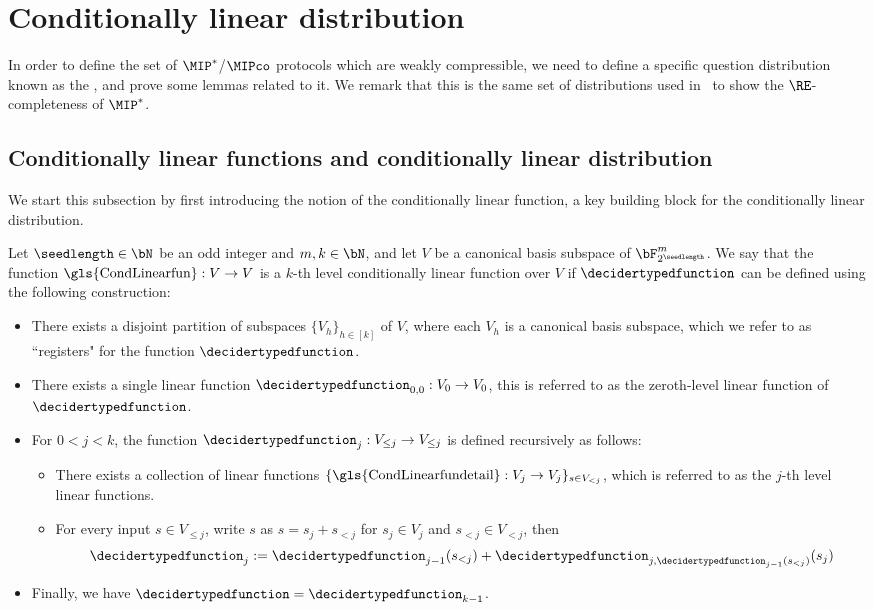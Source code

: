 \section{Conditionally linear distribution} \label{sec:condlineardistribution}

In order to define the set of $\MIP^*$/$\MIPco$ protocols which are weakly compressible, we need to define a specific question distribution known as the , and prove some lemmas related to it. We remark that this is the same set of distributions used in~\cite{jiMIPRE2022a} to show the $\RE$-completeness of $\MIP^*$. 

\subsection{Conditionally linear functions and conditionally linear distribution}  \label{sec:condlinearfun}
We start this subsection by first introducing the notion of the conditionally linear function, a key building block for the conditionally linear distribution.
\begin{definition} \label{def:condlinfun}
	Let $\seedlength \in \bN$ be an odd integer and $m, k \in \bN$, and let $V$ be a canonical basis subspace of $\bF_{2^{\seedlength}}^m$. We say that the function $\text{\gls{CondLinearfun}}: V \rightarrow V$ is a $k$-th level conditionally linear function over $V$ if $\decidertypedfunction$ can be defined using the following construction: 
	\begin{itemize}
		\item There exists a disjoint partition of subspaces $\{V_h\}_{h \in [k]}$ of $V$, where each $V_h$ is a canonical basis subspace, which we refer to as ``registers" for the function $\decidertypedfunction$.
		\item There exists a single linear function $\decidertypedfunction_{0,0}: V_{0} \rightarrow V_0$, this is referred to as the zeroth-level linear function of $\decidertypedfunction$. 
		\item For $0 < j < k$, the function $\decidertypedfunction_{j}: V_{\leq j} \rightarrow V_{\leq j}$ is defined recursively as follows:
		\begin{itemize}
			\item There exists a collection of linear functions $\{\text{\gls{CondLinearfundetail}}: V_j \rightarrow V_j\}_{s \in V_{< j}}$, which is referred to as the $j$-th level linear functions. 
			\item For every input $s \in V_{\leq j}$, write $s$ as $s = s_{j} + s_{< j}$ for $s_j \in V_j$ and $s_{< j} \in V_{< j}$, then
			\begin{equation*}
				\decidertypedfunction_{j} := \decidertypedfunction_{j-1}(s_{< j}) + \decidertypedfunction_{j,  \decidertypedfunction_{j-1}(s_{< j})}(s_j)
			\end{equation*} 
		\end{itemize}
		\item Finally, we have $\decidertypedfunction = \decidertypedfunction_{k-1}$.
	\end{itemize}     
\end{definition}

